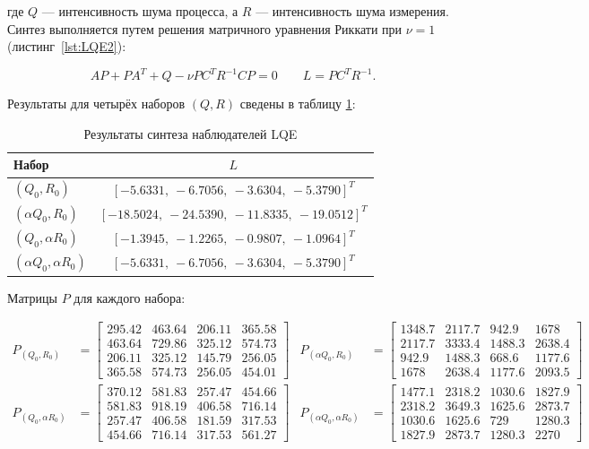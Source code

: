 \documentclass[a4paper,12pt]{article}
\begin{document}
где $Q$ --- интенсивность шума процесса, а $R$ --- интенсивность шума измерения. Синтез выполняется путем решения матричного уравнения Риккати при $\nu = 1$ (листинг~\ref{lst:LQE2}):

\[
AP + PA^T + Q - \nu PC^T R^{-1} C P = 0 \qquad L = PC^T R^{-1}.
\]

Результаты для четырёх наборов $(Q,R)$ сведены в таблицу \ref{tab:lqe_results}:

\begin{table}[H]
	\centering
	\caption{Результаты синтеза наблюдателей LQE}
	\label{tab:lqe_results}
	\renewcommand{\arraystretch}{1.3}
	\begin{tabular}{@{}lc@{}}
		\toprule
		\textbf{Набор} & \textbf{\(L\)} \\
		\midrule
		\((Q_0, R_0)\) & \([-5.6331, \ -6.7056, \ -3.6304, \ -5.3790]^T\) \\
		\((\alpha Q_0, R_0)\) & \([-18.5024, \ -24.5390, \ -11.8335, \ -19.0512]^T\) \\
		\((Q_0, \alpha R_0)\) & \([-1.3945, \ -1.2265, \ -0.9807, \ -1.0964]^T\) \\
		\((\alpha Q_0, \alpha R_0)\) & \([-5.6331, \ -6.7056, \ -3.6304, \ -5.3790]^T\) \\
		\bottomrule
	\end{tabular}
\end{table}

Матрицы $P$ для каждого набора:

\[
\begin{aligned}
	P_{(Q_0,R_0)} &= 
	\begin{bmatrix}
		295.42 & 463.64 & 206.11 & 365.58 \\
		463.64 & 729.86 & 325.12 & 574.73 \\
		206.11 & 325.12 & 145.79 & 256.05 \\
		365.58 & 574.73 & 256.05 & 454.01
	\end{bmatrix} &
	P_{(\alpha Q_0,R_0)} &= 
	\begin{bmatrix}
		1348.7 & 2117.7 & 942.9 & 1678 \\
		2117.7 & 3333.4 & 1488.3 & 2638.4 \\
		942.9 & 1488.3 & 668.6 & 1177.6 \\
		1678 & 2638.4 & 1177.6 & 2093.5
	\end{bmatrix} \\[1.5cm]
	P_{(Q_0,\alpha R_0)} &= 
	\begin{bmatrix}
		370.12 & 581.83 & 257.47 & 454.66 \\
		581.83 & 918.19 & 406.58 & 716.14 \\
		257.47 & 406.58 & 181.59 & 317.53 \\
		454.66 & 716.14 & 317.53 & 561.27
	\end{bmatrix} &
	P_{(\alpha Q_0,\alpha R_0)} &= 
	\begin{bmatrix}
		1477.1 & 2318.2 & 1030.6 & 1827.9 \\
		2318.2 & 3649.3 & 1625.6 & 2873.7 \\
		1030.6 & 1625.6 & 729 & 1280.3 \\
		1827.9 & 2873.7 & 1280.3 & 2270
	\end{bmatrix}
\end{aligned}
\]
	
\end{document}
